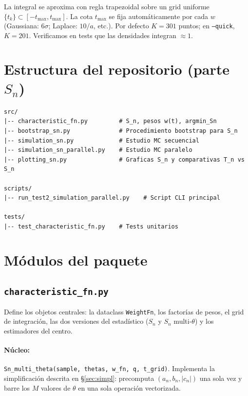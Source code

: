 \documentclass[11pt,a4paper]{article}
\begin{document}
\begin{notebox}[title=Cuadratura]
La integral se aproxima con regla trapezoidal sobre un grid uniforme
$\{t_k\}\subset[-t_{\max},t_{\max}]$. La cota $t_{\max}$ se fija
automáticamente por cada $w$ (Gaussiana: $6\sigma$; Laplace: $10/a$,
etc.). Por defecto $K=301$ puntos; en \texttt{--quick}, $K=201$.
Verificamos en tests que las densidades integran $\approx 1$.
\end{notebox}

\section{Estructura del repositorio (parte $S_n$)}

\begin{lstlisting}[basicstyle=\ttfamily\small, frame=single, backgroundcolor=\color{codebg}]
src/
|-- characteristic_fn.py         # S_n, pesos w(t), argmin_Sn
|-- bootstrap_sn.py              # Procedimiento bootstrap para S_n
|-- simulation_sn.py             # Estudio MC secuencial
|-- simulation_sn_parallel.py    # Estudio MC paralelo
|-- plotting_sn.py               # Graficas S_n y comparativas T_n vs S_n

scripts/
|-- run_test2_simulation_parallel.py    # Script CLI principal

tests/
|-- test_characteristic_fn.py    # Tests unitarios
\end{lstlisting}

\section{Módulos del paquete}

\subsection{\texttt{characteristic\_fn.py}}

Define los objetos centrales: la dataclass \texttt{WeightFn}, los
factorías de pesos, el grid de integración, las dos versiones del
estadístico ($S_n$ y $S_n$ multi-$\theta$) y los estimadores del
centro.

\paragraph{Núcleo:} \texttt{Sn\_multi\_theta(sample, thetas, w\_fn, q, t\_grid)}.
Implementa la simplificación descrita en \S\ref{sec:simpl}: precomputa
$(a_n, b_n, |c_n|)$ una sola vez y barre los $M$ valores de $\theta$ en
una sola operación vectorizada.
\end{document}
